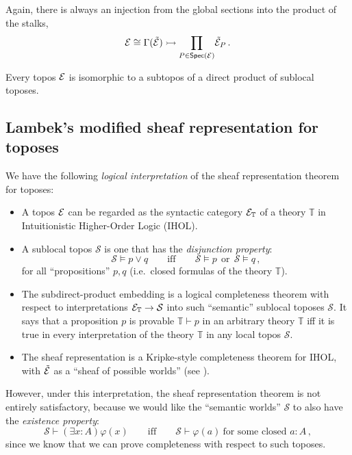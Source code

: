 \documentclass[lambek.tex]{subfiles}
\begin{document}
Again, there is always an injection from the global sections into the product of the stalks,
\[
\mathcal{E} \cong \Gamma(\tilde{\mathcal{E}}) \rightarrowtail \prod_{P\in \mathsf{Spec}(\mathcal{E})}\!\tilde{\mathcal{E}}_P\,.
\]

\begin{corollary}
Every topos $\mathcal{E}$ is isomorphic to a  subtopos of a  direct product of sublocal toposes.
\end{corollary}

\subsection{Lambek's modified sheaf representation for toposes}


We have the following \emph{logical interpretation} of the sheaf representation theorem for toposes:
%
\begin{itemize}
\item A topos $\mathcal{E}$ can be regarded as the syntactic category $\mathcal{E}_\mathbb{T}$ of a theory $\mathbb{T}$ in Intuitionistic Higher-Order Logic (IHOL).

\item A sublocal topos $\mathcal{S}$ is one that has the \emph{disjunction property}:
\[
\mathcal{S}\models p\vee q \qquad\text{iff}\qquad \mathcal{S}\models p\  \ \text{or}\  \ \mathcal{S}\models q\,,
\]
for all ``propositions''  $p, q$ (i.e.\ closed formulas of the theory $\mathbb{T}$).

\item  The subdirect-product embedding is a logical completeness theorem with respect to interpretations $\mathcal{E}_\mathbb{T}\to\mathcal{S}$ into such ``semantic'' sublocal toposes $\mathcal{S}$.  It says that a proposition $p$ is provable $\mathbb{T}\vdash p$ in an arbitrary theory $\mathbb{T}$ iff it is true in every interpretation of the theory $\mathbb{T}$ in any local topos $\mathcal{S}$.

\item The sheaf representation is a Kripke-style completeness theorem for IHOL, with $\tilde{\mathcal{E}}$ as a ``sheaf of possible worlds'' (see \cite{Lambeck:sheaf of possible worlds}).
\end{itemize}

However, under this interpretation, the sheaf representation theorem is not entirely satisfactory, because we would like the ``semantic worlds'' $\mathcal{S}$ to also have the \emph{existence property}:
\[
\mathcal{S}\vdash (\exists x:A)\varphi(x) \qquad\text{iff}\qquad  \mathcal{S}\vdash \varphi(a)\ \text{for some closed $a:A$}\,,
\] 
since we know that we can prove completeness with respect to such toposes.
\medskip
\end{document}
